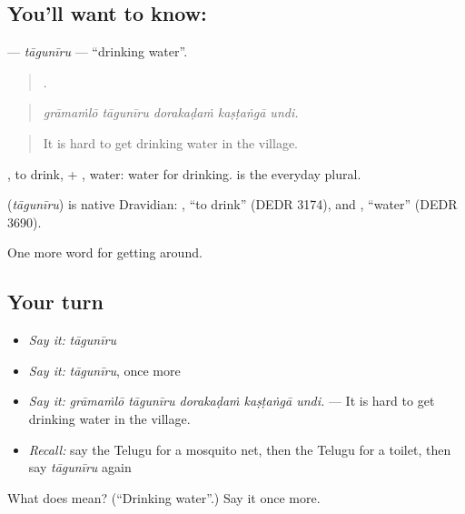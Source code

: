 \subsection*{You'll want to know: }
\textbf{} — \emph{tāgunīru} — \textquotedblleft{}drinking water\textquotedblright{}.

\begin{quote}
    .
\end{quote}

\begin{quote}
\emph{grāmaṁlō tāgunīru dorakaḍaṁ kaṣṭaṅgā undi.}
\end{quote}

\begin{quote}
It is hard to get drinking water in the village.
\end{quote}

, to drink, + , water: water for drinking.  is the everyday plural.

\begin{cousinweb}
\textbf{} (\emph{tāgunīru}) is native Dravidian: , \textquotedblleft{}to drink\textquotedblright{} (DEDR 3174), and , \textquotedblleft{}water\textquotedblright{} (DEDR 3690).
\end{cousinweb}

\begin{grammarlens}[title={What you've built}]
One more word for getting around.
\end{grammarlens}

\subsection*{Your turn}
\begin{itemize}
\raggedright
  \item \emph{Say it:} \emph{tāgunīru}
  \item \emph{Say it:} \emph{tāgunīru}, once more
  \item \emph{Say it:} \emph{grāmaṁlō tāgunīru dorakaḍaṁ kaṣṭaṅgā undi.} — It is hard to get drinking water in the village.
  \item \emph{Recall:} say the Telugu for a mosquito net, then the Telugu for a toilet, then say \emph{tāgunīru} again
\end{itemize}

\begin{tcolorbox}[breakable,colback=teal!4,colframe=teal!35!black,title={Before you move on}]
What does  mean? (\textquotedblleft{}Drinking water\textquotedblright{}.) Say it once more.
\end{tcolorbox}
